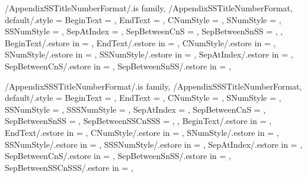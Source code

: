 
\pgfkeys
{
  /AppendixSSTitleNumberFormat/.is family, /AppendixSSTitleNumberFormat,
  default/.style =
  {
    BeginText = \empty,
    EndText = \empty,
    CNumStyle = \empty,
    SNumStyle = \empty,
    SSNumStyle = \empty,
    SepAtIndex = \empty, %
    SepBetweenCnS = \empty, %
    SepBetweenSnSS = \empty, %
  },
  BeginText/.estore in = \GetAppendixSSTitleNumberFormatBeginText,
  EndText/.estore in = \GetAppendixSSTitleNumberFormatEndText,
  CNumStyle/.estore in = \GetAppendixSSTitleNumberFormatCNumStyle,
  SNumStyle/.estore in = \GetAppendixSSTitleNumberFormatSNumStyle,
  SSNumStyle/.estore in = \GetAppendixSSTitleNumberFormatSSNumStyle,
  SepAtIndex/.estore in = \GetAppendixSSTitleNumberFormatSepAtIndex,
  SepBetweenCnS/.estore in = \GetAppendixSSTitleNumberFormatSepBetweenCnS,
  SepBetweenSnSS/.estore in = \GetAppendixSSTitleNumberFormatSepBetweenSnSS,
} %

\newcommand\GetAppendixSubSectionTitleNumberFormatString{}
\newcommand\SetupAppendixSubSectionTitleNumberFormatString
{%
  \SetupTitleNumberFormatString{AppendixSubSection}%
  {%
    BeginText=\GetAppendixSSTitleNumberFormatBeginText,%
    EndText=\GetAppendixSSTitleNumberFormatEndText,%
    CNumStyle=\GetAppendixSSTitleNumberFormatCNumStyle,%
    SNumStyle=\GetAppendixSSTitleNumberFormatSNumStyle,%
    SSNumStyle=\GetAppendixSSTitleNumberFormatSSNumStyle,%
    SepAtIndex=\GetAppendixSSTitleNumberFormatSepAtIndex,%
    SepBetweenCnS=\GetAppendixSSTitleNumberFormatSepBetweenCnS,%
    SepBetweenSnSS=\GetAppendixSSTitleNumberFormatSepBetweenSnSS,%
    CCounterName=appendixchapter,%
    SCounterName=appendixsection,%
    SSCounterName=appendixsubsection,%
  }{\GetAppendixSubSectionTitleNumberFormatString}%
} %


\pgfkeys
{
  /AppendixSSSTitleNumberFormat/.is family, /AppendixSSSTitleNumberFormat,
  default/.style =
  {
    BeginText = \empty,
    EndText = \empty,
    CNumStyle = \empty,
    SNumStyle = \empty,
    SSNumStyle = \empty,
    SSSNumStyle = \empty,
    SepAtIndex = \empty, %
    SepBetweenCnS = \empty, %
    SepBetweenSnSS = \empty, %
    SepBetweenSSCnSSS = \empty, %
  },
  BeginText/.estore in = \GetAppendixSSSTitleNumberFormatBeginText,
  EndText/.estore in = \GetAppendixSSSTitleNumberFormatEndText,
  CNumStyle/.estore in = \GetAppendixSSSTitleNumberFormatCNumStyle,
  SNumStyle/.estore in = \GetAppendixSSSTitleNumberFormatSNumStyle,
  SSNumStyle/.estore in = \GetAppendixSSSTitleNumberFormatSSNumStyle,
  SSSNumStyle/.estore in = \GetAppendixSSSTitleNumberFormatSSSNumStyle,
  SepAtIndex/.estore in = \GetAppendixSSSTitleNumberFormatSepAtIndex,
  SepBetweenCnS/.estore in = \GetAppendixSSSTitleNumberFormatSepBetweenCnS,
  SepBetweenSnSS/.estore in = \GetAppendixSSSTitleNumberFormatSepBetweenSnSS,
  SepBetweenSSCnSSS/.estore in = \GetAppendixSSSTitleNumberFormatSepBetweenSSCnSSS,
} %

